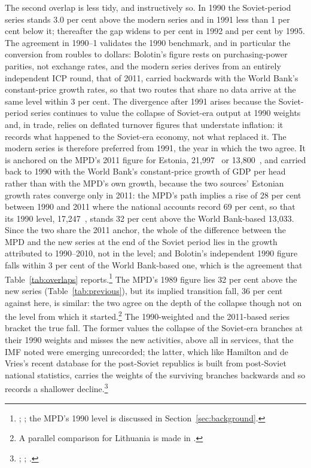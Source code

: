 The second overlap is less tidy, and instructively so. In 1990 the Soviet-period series stands 3.0 per cent above the modern series and in 1991 less than 1 per cent below it; thereafter the gap widens to  per cent in 1992 and  per cent by 1995. The agreement in 1990--1 validates the 1990 benchmark, and in particular the conversion from roubles to dollars: Bolotin's figure rests on purchasing-power parities, not exchange rates, and the modern series derives from an entirely independent ICP round, that of 2011, carried backwards with the World Bank's constant-price growth rates, so that two routes that share no data arrive at the same level within 3 per cent. The divergence after 1991 arises because the Soviet-period series continues to value the collapse of Soviet-era output at 1990 weights and, in trade, relies on deflated turnover figures that understate inflation: it records what happened to the Soviet-era economy, not what replaced it. The modern series is therefore preferred from 1991, the year in which the two agree. It is anchored on the MPD's 2011 figure for Estonia, 21,997~\intltwenty{} or 13,800~\intlnineteen{}, and carried back to 1990 with the World Bank's constant-price growth of GDP per head rather than with the MPD's own growth, because the two sources' Estonian growth rates converge only in 2011: the MPD's path implies a rise of 28 per cent between 1990 and 2011 where the national accounts record 69 per cent, so that its 1990 level, 17,247~\intltwenty{}, stands 32 per cent above the World Bank-based 13,033. Since the two share the 2011 anchor, the whole of the difference between the MPD and the new series at the end of the Soviet period lies in the growth attributed to 1990--2010, not in the level; and Bolotin's independent 1990 figure falls within 3 per cent of the World Bank-based one, which is the agreement that Table~\ref{tab:overlaps} reports.\footnote{\autocite{mpd2023}; \autocite{wdi2024}; the MPD's 1990 level is discussed in Section~\ref{sec:background}.} The MPD's 1989 figure lies 32 per cent above the new series (Table~\ref{tab:previous}), but its implied transition fall, 36 per cent against \eeTROUGHpct{} here, is similar: the two agree on the depth of the collapse though not on the level from which it started.\footnote{A parallel comparison for Lithuania is made in \autocite[6, 26--8]{klimantas2026soviet}.} The 1990-weighted and the 2011-based series bracket the true fall. The former values the collapse of the Soviet-era branches at their 1990 weights and misses the new activities, above all in services, that the IMF noted were emerging unrecorded; the latter, which like Hamilton and de Vries's recent database for the post-Soviet republics is built from post-Soviet national statistics, carries the weights of the surviving branches backwards and so records a shallower decline.\footnote{\autocite[11]{imf_transition}; \autocite[4--5]{hamilton_transition}; \autocite[5]{baltictransitioncontraction}.}

